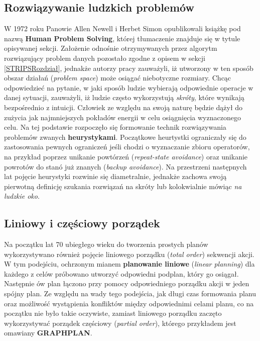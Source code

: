     \subsection{Rozwiązywanie ludzkich problemów}
    W 1972 roku Panowie Allen Newell i Herbet Simon opublikowali książkę pod nazwą \textbf{Human Problem Solving}, której tłumaczenie
    znajduje się w tytule opisywanej sekcji. Założenie odnośnie otrzymywanych przez algorytm rozwiązujący problem danych 
    pozostało zgodne z opisem w sekcji \ref{STRIPSRozdział}, jednakże autorzy pracy zauważyli, iż utworzony w ten sposób 
    obszar działań (\textit{problem space}) może osiągać niebotyczne rozmiary. Chcąc odpowiedzieć na pytanie, 
    w jaki sposób ludzie wybierają odpowiednie operacje w danej sytuacji, zauważyli, iż ludzie często wykorzystują \textit{skróty},
    które wynikają bezpośrednio z intuicji. Człowiek ze względu na swoją naturę będzie dążył do zużycia jak najmniejszych 
    pokładów energii w celu osiągnięcia wyznaczonego celu. Na tej podstawie rozpoczęło się formowanie 
    technik rozwiązywania problemów zwanych \textbf{heurystykami}. Początkowe heurtystki ograniczały się do zastosowania 
    pewnych ograniczeń jeśli chodzi o wyznaczanie zbioru operatorów, na przykład poprzez unikanie powtórzeń (\textit{repeat-state avoidance})
    oraz unikanie powrotów do stanó już znanych (\textit{backup avoidance}). Na przestrzeni następnych lat pojęcie heurystyki rozwinie się diametralnie, jednakże
    zachowa swoją pierwotną definicję szukania rozwiązań na skróty lub kolokwialnie mówiąc \textit{na ludzkie oko}.  

    \subsection{Liniowy i częściowy porządek}
    Na początku lat 70 ubiegłego wieku do tworzenia prostych planów wykorzystywano również pojęcie 
    liniowego porządku (\textit{total order}) sekwencji akcji. W tym podejściu, ochrzonym mianem \textbf{planowanie liniowe}
    (\textit{linear planning}) dla każdego z celów  próbowano utworzyć odpowiedni podplan, który go osiągał.
    Następnie ów plan łączono przy pomocy odpowiedniego porządku akcji w jeden spójny plan.
    Ze względu na wady tego podejścia, jak długi czas formowania planu oraz możliwość wystąpienia konfliktów między 
    odpowiednimi celami planu, co na początku nie było takie oczywiste, zamiast liniowego porządku zaczęto wykorzystywać porządek częściowy (\textit{partial order}),
    którego przykładem jest omawiany \textbf{GRAPHPLAN}.


